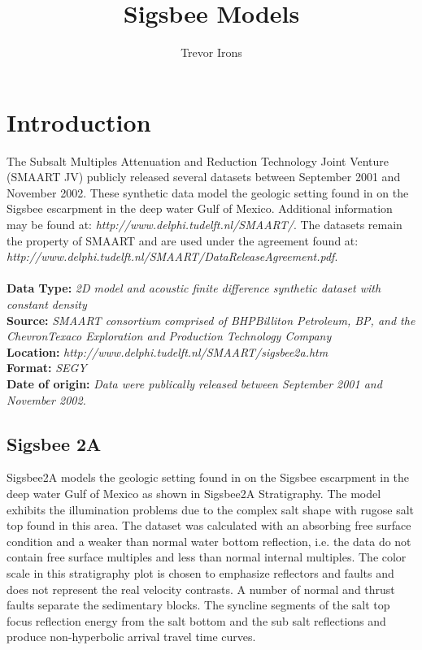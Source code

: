 \title{Sigsbee Models}
\author{Trevor Irons}
\maketitle

\lstset{language=python,numbers=left,numberstyle=\tiny,showstringspaces=false}

\section{Introduction}
The Subsalt Multiples Attenuation and Reduction Technology Joint Venture (SMAART JV) publicly released several datasets between September 2001 and November 2002.  These synthetic data model the geologic setting found in on the Sigsbee escarpment in the deep water Gulf of Mexico.  Additional information may be found at: \emph{http://www.delphi.tudelft.nl/SMAART/}.  The datasets remain the property of SMAART and are used under the agreement found at: \emph{http://www.delphi.tudelft.nl/SMAART/DataReleaseAgreement.pdf}.  
\\
\\
\textbf	{
	Data Type:} \emph{2D model and acoustic finite difference synthetic dataset with constant density}\\
\textbf	{   
	Source:} \emph{SMAART consortium comprised of BHPBilliton Petroleum, BP, and the ChevronTexaco Exploration and Production Technology Company}\\
\textbf {                             
 	Location:} \emph{http://www.delphi.tudelft.nl/SMAART/sigsbee2a.htm}\\
\textbf	{
       	Format:} \emph{SEGY} \\
\textbf{
	Date of origin:} \emph{Data were publically released between September 2001 and November 2002.}\\ 

\subsection{Sigsbee 2A}
Sigsbee2A models the geologic setting found in on the Sigsbee escarpment in the deep water Gulf of Mexico as shown in Sigsbee2A Stratigraphy. The model exhibits the illumination problems due to the complex salt shape with rugose salt top found in this area. The dataset was calculated with an absorbing free surface condition and a weaker than normal water bottom reflection, i.e. the data do not contain free surface multiples and less than normal internal multiples.  The color scale in this stratigraphy plot is chosen to emphasize reflectors and faults and does not represent the real velocity contrasts.  A number of normal and thrust faults separate the sedimentary blocks. The syncline segments of the salt top focus reflection energy from the salt bottom and the sub salt reflections and produce non-hyperbolic arrival travel time curves.

